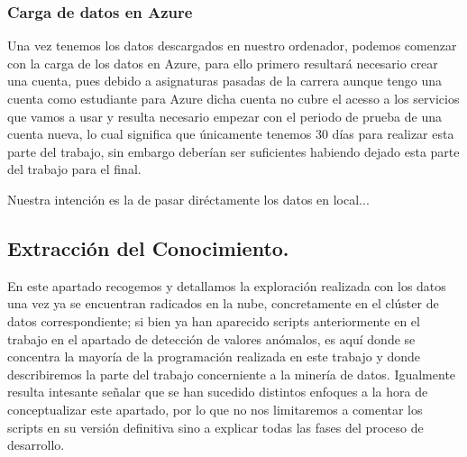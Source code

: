 \documentclass[11pt, a4paper]{article} %
\begin{document}
\subsubsection{Carga de datos en Azure}
Una vez tenemos los datos descargados en nuestro ordenador, podemos comenzar con la carga de los datos en Azure, para ello primero resultará necesario crear una cuenta, pues debido a asignaturas pasadas de la carrera aunque tengo una cuenta como estudiante para Azure dicha cuenta no cubre el acesso a los servicios que vamos a usar y resulta necesario empezar con el periodo de prueba de una cuenta nueva, lo cual significa que únicamente tenemos 30 días para realizar esta parte del trabajo, sin embargo deberían ser suficientes habiendo dejado esta parte del trabajo para el final.


Nuestra intención es la de pasar diréctamente los datos en local...
\subsection{Extracción del Conocimiento.}
En este apartado recogemos y detallamos la exploración realizada con los datos una vez ya se encuentran radicados en la nube, concretamente en el clúster de datos correspondiente; si bien ya han aparecido scripts anteriormente en el trabajo en el apartado de detección de valores anómalos, es aquí donde se concentra la mayoría de la programación realizada en este trabajo y donde describiremos la parte del trabajo concerniente a la minería de datos. Igualmente resulta intesante señalar que se han sucedido distintos enfoques a la hora de conceptualizar este apartado, por lo que no nos limitaremos a comentar los scripts en su versión definitiva sino a explicar todas las fases del proceso de desarrollo.
\end{document}
